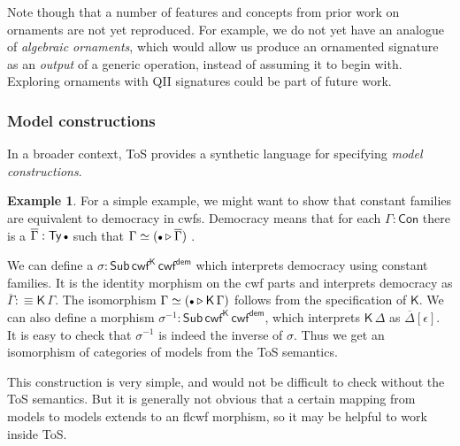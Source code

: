 \documentclass[12pt,a4paper,twoside,openany]{book}
\theoremstyle{remark}
\theoremstyle{definition}
\newtheorem{myexample}{Example}
\theoremstyle{theorem}
\newcommand{\ms}[1]{\mathsf{#1}}
\newcommand{\Con}{\mathsf{Con}}
\newcommand{\Sub}{\mathsf{Sub}}
\newcommand{\Ty}{\mathsf{Ty}}
\newcommand{\ext}{\triangleright}
\newcommand{\emptycon}{\scaleobj{.75}\bullet}
\newcommand{\K}{\mathsf{K}}
\newcommand{\defn}{:\equiv}
\begin{document}
Note though that a number of features and concepts from prior work on ornaments
are not yet reproduced. For example, we do not yet have an analogue of
\emph{algebraic ornaments}, which would allow us produce an ornamented signature
as an \emph{output} of a generic operation, instead of assuming it to begin
with. Exploring ornaments with QII signatures could be part of future work.

\subsubsection{Model constructions}

In a broader context, ToS provides a synthetic language for specifying
\emph{model constructions}.

\begin{myexample}
For a simple example, we might want to show that constant families are
equivalent to democracy in cwfs. Democracy means that for each $\Gamma : \Con$
there is a $\overline{\Gamma} : \Ty\,\emptycon$ such that $\Gamma \simeq
(\emptycon\ext\overline{\Gamma})$ \cite[Section~3.1]{flccc-undecidability}.

We can define a $\sigma : \Sub\,\ms{cwf^K}\,\ms{cwf^{dem}}$ which interprets
democracy using constant families. It is the identity morphism on the cwf parts
and interprets democracy as $\overline{\Gamma} \defn \ms{K}\,\Gamma$. The
isomorphism $\Gamma \simeq (\emptycon \ext \K\,\Gamma)$ follows from the
specification of $\K$. We can also define a morphism $\sigma^{-1} :
\Sub\,\ms{cwf^K}\,\ms{cwf^{dem}}$, which interprets $\K\,\Delta$ as
$\overline{\Delta}[\epsilon]$. It is easy to check that $\sigma^{-1}$ is indeed
the inverse of $\sigma$. Thus we get an isomorphism of categories of models
from the ToS semantics.

This construction is very simple, and would not be difficult to check without
the ToS semantics. But it is generally not obvious that a certain mapping from
models to models extends to an flcwf morphism, so it may be helpful
to work inside ToS.
\end{myexample}
\end{document}
